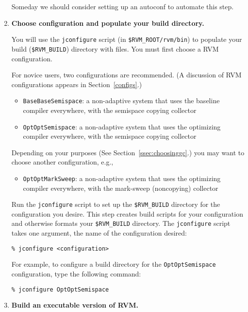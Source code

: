 \begin{enumerate}
Someday we should consider setting up an autoconf to automate this
step.

\item {\bf Choose configuration and populate your build directory.}

You will use the {\tt jconfigure} script (in {\tt \$RVM\_ROOT/rvm/bin}) to
populate your build ({\tt \$RVM\_BUILD}) directory with files.  You must
first choose a RVM configuration.

For novice users, two configurations are recommended.  (A discussion
of RVM configurations appears in Section~\ref{configs}.)

\begin{itemize}
\item {\tt BaseBaseSemispace}: a non-adaptive system that uses the
baseline compiler everywhere, with the semispace copying collector
\item {\tt OptOptSemispace}: a non-adaptive system that uses the
optimizing compiler everywhere, with the semispace copying collector
\end{itemize}

Depending on your purposes (See Section~\ref{ssec:choosinggc}.) you
may want to choose another configuration, e.g.,
\begin{itemize}
\item {\tt OptOptMarkSweep}: a non-adaptive system that uses the
optimizing  compiler everywhere, with the mark-sweep (noncopying) collector
\end{itemize}

Run the {\tt jconfigure} script to set up the {\tt \$RVM\_BUILD}
directory for the configuration you desire.  This step creates
build scripts for your configuration and otherwise formats your
{\tt \$RVM\_BUILD} directory.
The {\tt jconfigure} script takes one argument, the name of the
configuration desired: 

\begin{verbatim}
% jconfigure <configuration>
\end{verbatim}

For example, to configure a build 
directory for the {\tt OptOptSemispace} configuration, type
the following command:

\begin{verbatim}
% jconfigure OptOptSemispace
\end{verbatim}

\item {\bf Build an executable version of RVM.}  


\end{enumerate}
